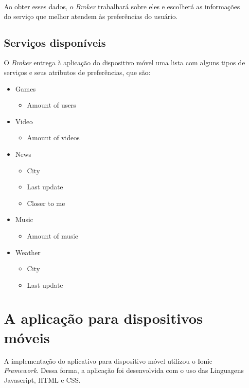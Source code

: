 Ao obter esses dados, o \textit{Broker} trabalhará sobre eles e escolherá as informações do serviço que melhor atendem às preferências do usuário.

\subsection{Serviços disponíveis}
O \textit{Broker} entrega à aplicação do dispositivo móvel uma lista com alguns tipos de serviços e seus atributos de preferências, que são:

\begin{footnotesize}
  \begin{itemize}
    \item Games
      \begin{itemize}
        \item Amount of users
      \end{itemize}
    \item Video
      \begin{itemize}
        \item Amount of videos
      \end{itemize}
    \item News
      \begin{itemize}
        \item City
        \item Last update
        \item Closer to me
      \end{itemize}
    \item Music
      \begin{itemize}
        \item Amount of music
      \end{itemize}
    \item Weather
      \begin{itemize}
        \item City
        \item Last update
      \end{itemize}
  \end{itemize}
\end{footnotesize}

\section{A aplicação para dispositivos móveis}
A implementação do aplicativo para dispositivo móvel utilizou o Ionic \textit{Framework}. Dessa forma, a aplicação foi desenvolvida com o uso das Linguagens Javascript, HTML e CSS.

